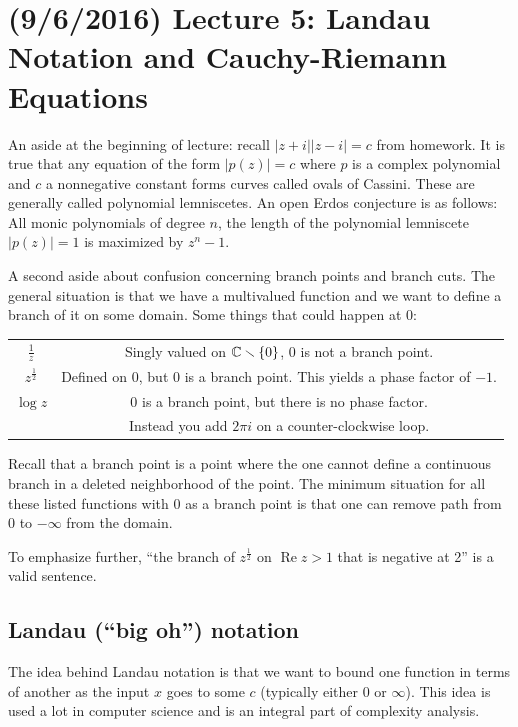 \documentclass[11pt,leqno,oneside]{amsart}
\renewcommand{\Re}{\operatorname{Re}}
\begin{document}
\section{(9/6/2016) Lecture 5: Landau Notation and Cauchy-Riemann Equations}
\begin{rmk*}
    An aside at the beginning of lecture: recall $|z+i||z-i|=c$ from homework.
    It is true that any equation of the form $|p(z)| = c$ where $p$ is a
    complex polynomial and $c$ a nonnegative constant forms curves called ovals
    of Cassini. These are generally called polynomial lemniscetes. An open
    Erdos conjecture is as follows: \\

    All monic polynomials of degree $n$, the length of the polynomial
    lemniscete $|p(z)|=1$ is maximized by $z^n-1$.
\end{rmk*}

    A second aside about confusion concerning branch points and branch cuts.
    The general situation is that we have a multivalued function and we want to
    define a branch of it on some domain. Some things that could happen at 0:
    \\
    \begin{tabular}{|c|c|}
        \hline
        $\frac{1}{z}$ & Singly valued on ${\mathbb C} \smallsetminus \{0\}$, 0 is not a
        branch point. \\
        $z^{\frac{1}{2}}$ & Defined on 0, but 0 is a branch point. This yields
        a phase factor of $-1$. \\
        $\log z$ & 0 is a branch point, but there is no phase factor. \\ \ & Instead
        you add $2\pi i$ on a counter-clockwise loop. \\
        \hline
    \end{tabular}
    Recall that a branch point is a point where the one cannot define a
    continuous branch in a deleted neighborhood of the point. The minimum
    situation for all these listed functions with 0 as a branch point is that
    one can remove path from 0 to $-\infty$ from the domain.

    To emphasize further, ``the branch of $z^\frac{1}{2}$ on $\Re z > 1$ that
    is negative at 2'' is a valid sentence.

    \subsection*{Landau (``big oh'') notation}
    The idea behind Landau notation is that we want to bound one function in
    terms of another as the input $x$ goes to some $c$ (typically either 0 or
    $\infty$). This idea is used a lot in computer science and is an integral
    part of complexity analysis.
\end{document}
